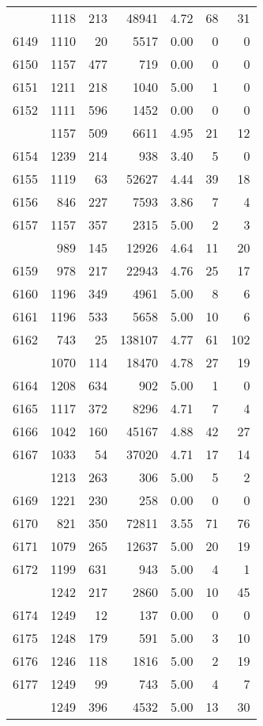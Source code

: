 \documentclass[
]{article}
\begin{document}
\begin{table}
\begin{tabular}[t]{lrrrrrr}
\addlinespace
6148 & 1118 & 213 & 48941 & 4.72 & 68 & 31\\
6149 & 1110 & 20 & 5517 & 0.00 & 0 & 0\\
6150 & 1157 & 477 & 719 & 0.00 & 0 & 0\\
6151 & 1211 & 218 & 1040 & 5.00 & 1 & 0\\
6152 & 1111 & 596 & 1452 & 0.00 & 0 & 0\\
\addlinespace
6153 & 1157 & 509 & 6611 & 4.95 & 21 & 12\\
6154 & 1239 & 214 & 938 & 3.40 & 5 & 0\\
6155 & 1119 & 63 & 52627 & 4.44 & 39 & 18\\
6156 & 846 & 227 & 7593 & 3.86 & 7 & 4\\
6157 & 1157 & 357 & 2315 & 5.00 & 2 & 3\\
\addlinespace
6158 & 989 & 145 & 12926 & 4.64 & 11 & 20\\
6159 & 978 & 217 & 22943 & 4.76 & 25 & 17\\
6160 & 1196 & 349 & 4961 & 5.00 & 8 & 6\\
6161 & 1196 & 533 & 5658 & 5.00 & 10 & 6\\
6162 & 743 & 25 & 138107 & 4.77 & 61 & 102\\
\addlinespace
6163 & 1070 & 114 & 18470 & 4.78 & 27 & 19\\
6164 & 1208 & 634 & 902 & 5.00 & 1 & 0\\
6165 & 1117 & 372 & 8296 & 4.71 & 7 & 4\\
6166 & 1042 & 160 & 45167 & 4.88 & 42 & 27\\
6167 & 1033 & 54 & 37020 & 4.71 & 17 & 14\\
\addlinespace
6168 & 1213 & 263 & 306 & 5.00 & 5 & 2\\
6169 & 1221 & 230 & 258 & 0.00 & 0 & 0\\
6170 & 821 & 350 & 72811 & 3.55 & 71 & 76\\
6171 & 1079 & 265 & 12637 & 5.00 & 20 & 19\\
6172 & 1199 & 631 & 943 & 5.00 & 4 & 1\\
\addlinespace
6173 & 1242 & 217 & 2860 & 5.00 & 10 & 45\\
6174 & 1249 & 12 & 137 & 0.00 & 0 & 0\\
6175 & 1248 & 179 & 591 & 5.00 & 3 & 10\\
6176 & 1246 & 118 & 1816 & 5.00 & 2 & 19\\
6177 & 1249 & 99 & 743 & 5.00 & 4 & 7\\
\addlinespace
6178 & 1249 & 396 & 4532 & 5.00 & 13 & 30\\

\end{tabular}
\end{table}
\end{document}
